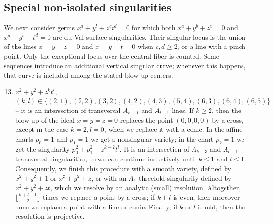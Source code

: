 \documentclass[a4paper]{amsart}
\theoremstyle{plain}
\theoremstyle{definition}
\theoremstyle{remark}
\numberwithin{equation}{section}
\begin{document}
\subsection{Special non-isolated singularities}
We next consider germs $x^{a}+y^{b}+z^{c}t^{d}=0$ for which both
$x^{a}+y^{b}+z^{c}=0$ and $x^{a}+y^{b}+t^{d}=0$ are du Val surface
singularities.  Their singular locus is the union of the lines
$x=y=z=0$ and $x=y=t=0$ when $c,d\ge2$, or a line with a pinch point.
Only the exceptional locus over the central fiber is counted.  Some
sequences introduce an additional vertical singular curve; whenever this
happens, that curve is included among the stated blow-up centers.



\begin{enumerate}[itemsep=2mm plus 2mm]
\setcounter{enumi}{12}
\item
$x^2 + y^2 + z^k t^{l}$, $(k,l)\in \{(2,1), (2,2), (3,2), (4,2), (4,3), (5,4), (6,3), (6,4), (6,5)\}$ -- it is an intersection of transversal $A_{k-1}$ and $A_{l-1}$ lines. If $k\ge2$, then the blow-up of the ideal $x=y=z=0$
replaces the point $(0,0,0,0)$ by a cross, except in the case $k=2, l=0$, when we replace it with a conic. In the affine charts $p_{0}=1$ and $p_{1}=1$ we get a nonsingular variety; in the chart $p_{2}=1$ we get the singularity $p_{0}^{2}+p_{1}^{2}+z^{k-2}t^{l}$. It is an intersection of $A_{k-3}$ and $A_{l-1}$ transversal singularities, so we can continue inductively until $k\le1$ and $l\le1$. Consequently, we finish this procedure with a smooth variety, defined by $x^{2}+y^{2}+1$ or $x^{2}+y^{2}+z$, or with an $A_{1}$ threefold singularity defined by $x^{2}+y^{2}+zt$, which we resolve by an analytic (small) resolution. Altogether, $\lfloor\frac{k+l-1}{2}\rfloor$ times we replace a point by a cross; if $k+l$ is even, then moreover once we replace a point with a line or conic. Finally, if $k$ or $l$ is odd, then the resolution is projective.


\end{enumerate}
\end{document}
